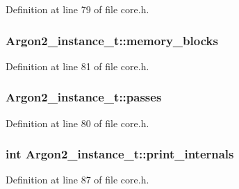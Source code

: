 Definition at line 79 of file core.\+h.

\hypertarget{struct_argon2__instance__t_a40e32466250c3eaa25458b89050f1d0d}{}
\subsubsection[{memory\+\_\+blocks}]{ Argon2\+\_\+instance\+\_\+t\+::memory\+\_\+blocks}\label{struct_argon2__instance__t_a40e32466250c3eaa25458b89050f1d0d}


Definition at line 81 of file core.\+h.

\hypertarget{struct_argon2__instance__t_a2783db68ff7f7801616f7c78e319ffd5}{}
\subsubsection[{passes}]{ Argon2\+\_\+instance\+\_\+t\+::passes}\label{struct_argon2__instance__t_a2783db68ff7f7801616f7c78e319ffd5}


Definition at line 80 of file core.\+h.

\hypertarget{struct_argon2__instance__t_a475fcf721a2e26d5239b21eb5fd01375}{}
\subsubsection[{print\+\_\+internals}]{\setlength{\rightskip}{0pt plus 5cm}int Argon2\+\_\+instance\+\_\+t\+::print\+\_\+internals}\label{struct_argon2__instance__t_a475fcf721a2e26d5239b21eb5fd01375}


Definition at line 87 of file core.\+h.

\hypertarget{struct_argon2__instance__t_a027cbd7a67c433446811f3c0f00099be}{}

